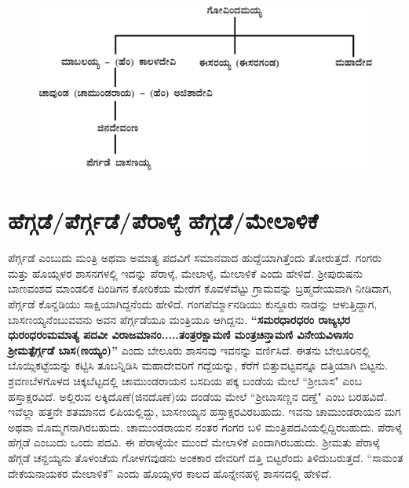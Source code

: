 \begin{figure}[H]
\includegraphics[scale=1.15]{images/chap3/chap3fig1.jpeg}
\end{figure}


\section{ಹೆಗ್ಗಡೆ/ಪೆರ್ಗ್ಗಡೆ/ಪೆರಾಳ್ಕೆ ಹೆಗ್ಗಡೆ/ಮೇಲಾಳಿಕೆ}

ಪೆರ್ಗ್ಗಡೆ ಎಂಬುದು ಮಂತ್ರಿ ಅಥವಾ ಅಮಾತ್ಯ ಪದವಿಗೆ ಸಮಾನವಾದ ಹುದ್ದೆಯಾಗಿತ್ತೆಂದು ತೋರುತ್ತದೆ. ಗಂಗರು ಮತ್ತು ಹೊಯ್ಸಳರ ಶಾಸನಗಳಲ್ಲಿ ಇದನ್ನು ಪೆರಾಳ್ಕೆ, ಮೇಲಾಳ್ಕೆ, ಮೇಲಾಳಿಕೆ ಎಂದು ಹೇಳಿದೆ. ಶ‍್ರೀಪುರುಷನು ಬಾಣವಂಶದ ಮಾಂಡಲಿಕ ದಿಂಡಿಗನ ಕೋರಿಕೆಯ ಮೇರೆಗೆ ಕೊವಳೆವೆಟ್ಟು ಗ್ರಾಮವನ್ನು ಬ್ರಹ್ಮದೇಯವಾಗಿ ನೀಡಿದಾಗ, ಪೆರ್ಗ್ಗಡೆ ಕೊನ್ದಡಿಯು ಸಾಕ್ಷಿಯಾಗಿದ್ದನೆಂದು ಹೇಳಿದೆ. ಗಂಗಪೆರ್ಮ್ಮಾನಡಿಯು ಕುನ್ದೂರು ನಾಡನ್ನು ಆಳುತ್ತಿದ್ದಾಗ, ಬಾಸಣಯ್ಯನೆಂಬುವವನು ಅವನ ಪೆರ್ಗ್ಗಡೆಯೂ ಮಂತ್ರಿಯೂ ಆಗಿದ್ದನು.\textbf{ “ಸಮರಧಾರಧರಂ ರಾಜ್ಯಭರ ಧುರಂಧರಂಮಮಾತ್ಯ ಪದವೀ ವಿರಾಜಮಾನಂ.....ತಂತ್ರರಕ್ಷಾಮಣಿ ಮಂತ್ರಚಿನ್ತಾಮಣಿ ವಿನೇಯವಿಳಾಸಂ ಶ‍್ರೀಮತ್ಪೆರ್ಗ್ಗಡೆ ಬಾಸ(ಣಯ್ಯಂ)” }ಎಂದು ಬೇಲೂರು ಶಾಸನವು ಇವನನ್ನು ವರ್ಣಿಸಿದೆ. ಈತನು ಬೇಲೂರಿನಲ್ಲಿ ಬೊಯ್ಸಿಕಟ್ಟೆಯನ್ನು ಕಟ್ಟಿಸಿ ತೂಬನ್ನಿಡಿಸಿ ಮಹಾದೇವರಿಗೆ ಗದ್ದೆಯನ್ನು, ಕೆರೆಗೆ ಬಿತ್ತುವಟ್ಟವನ್ನೂ ದತ್ತಿಯಾಗಿ ಬಿಟ್ಟನು. ಶ್ರವಣಬೆಳಗೊಳದ ಚಿಕ್ಕಬೆಟ್ಟದಲ್ಲಿ ಚಾಮುಂಡರಾಯನ ಬಸದಿಯ ಪಕ್ಕ ಬಂಡೆಯ ಮೇಲೆ “ಶ‍್ರೀಬಾಸ" ಎಂಬ ಹಸ್ತಾಕ್ಷರವಿದೆ. ಅಲ್ಲಿರುವ ಲಕ್ಕಿದೊಣೆ(ಜಿನದೊಣೆ)ಯ ದಂಡೆಯ ಮೇಲೆ “ಶ‍್ರೀಬಾಸಣ್ಣನ ದಣ್ಡೆ" ಎಂಬ ಬರಹವಿದೆ. ಇವೆಲ್ಲಾ ಹತ್ತನೇ ಶತಮಾನದ ಲಿಪಿಯಲ್ಲಿದ್ದು, ಬಾಸಣಯ್ಯನ ಹಸ್ತಾಕ್ಷರವಿರಬಹುದು. ಇವನು ಚಾಮುಂಡರಾಯನ ಮಗ ಅಥವಾ ಮೊಮ್ಮಗನಾಗಿರಬಹುದು. ಚಾಮುಂಡರಾಯನ ನಂತರ ಗಂಗರ ಬಳಿ ಮಂತ್ರಿಪದವಿ\-ಯಲ್ಲಿದ್ದಿರಬಹುದು. ಪೆರಾಳ್ಕೆ ಹೆಗ್ಗಡೆ ಎಂಬುದು ಒಂದು ಪದವಿ. ಈ ಪೆರಾಳ್ಕೆಯೇ ಮುಂದೆ ಮೇಲಾಳಿಕೆ ಎಂದಾಗಿರಬಹುದು. ಶ‍್ರೀಮತು ಪೆರಾಳ್ಕೆ ಹೆಗ್ಗಡೆ ಚನ್ದಯ್ಯನು ತೊಳಂಚೆಯ ಗೋಳಗವುಡನು ಅಂಕಕಾರ ದೇವರಿಗೆ ದತ್ತಿ ಬಿಟ್ಟರೆಂದು ತಿಳಿದುಬರುತ್ತದೆ. “ಸಾಮಂತ ದೇಕೆಯನಾಯಕರ ಮೇಲಾಳಿಕೆ” ಎಂದು ಹೊಯ್ಸಳರ ಕಾಲದ ಹೊನ್ನೇನಹಳ್ಳಿ ಶಾಸನದಲ್ಲಿ ಹೇಳಿದೆ.

